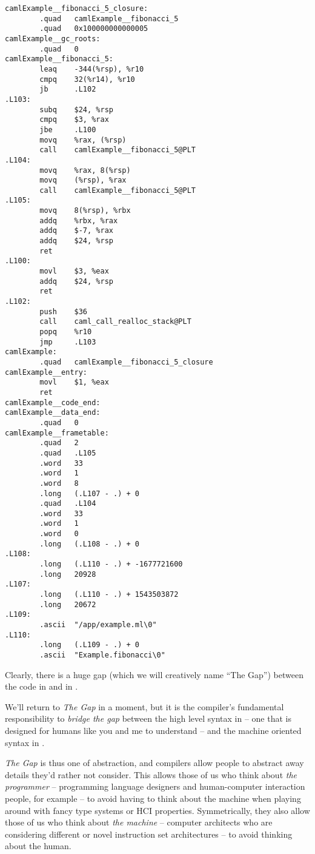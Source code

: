 \begin{code}
\label{code:fib-assembly}
\begin{verbatim}
camlExample__fibonacci_5_closure:
        .quad   camlExample__fibonacci_5
        .quad   0x100000000000005
camlExample__gc_roots:
        .quad   0
camlExample__fibonacci_5:
        leaq    -344(%rsp), %r10
        cmpq    32(%r14), %r10
        jb      .L102
.L103:
        subq    $24, %rsp
        cmpq    $3, %rax
        jbe     .L100
        movq    %rax, (%rsp)
        call    camlExample__fibonacci_5@PLT
.L104:
        movq    %rax, 8(%rsp)
        movq    (%rsp), %rax
        call    camlExample__fibonacci_5@PLT
.L105:
        movq    8(%rsp), %rbx
        addq    %rbx, %rax
        addq    $-7, %rax
        addq    $24, %rsp
        ret
.L100:
        movl    $3, %eax
        addq    $24, %rsp
        ret
.L102:
        push    $36
        call    caml_call_realloc_stack@PLT
        popq    %r10
        jmp     .L103
camlExample:
        .quad   camlExample__fibonacci_5_closure
camlExample__entry:
        movl    $1, %eax
        ret
camlExample__code_end:
camlExample__data_end:
        .quad   0
camlExample__frametable:
        .quad   2
        .quad   .L105
        .word   33
        .word   1
        .word   8
        .long   (.L107 - .) + 0
        .quad   .L104
        .word   33
        .word   1
        .word   0
        .long   (.L108 - .) + 0
.L108:
        .long   (.L110 - .) + -1677721600
        .long   20928
.L107:
        .long   (.L110 - .) + 1543503872
        .long   20672
.L109:
        .ascii  "/app/example.ml\0"
.L110:
        .long   (.L109 - .) + 0
        .ascii  "Example.fibonacci\0"
\end{verbatim}
\end{code}

Clearly, there is a huge gap (which we will creatively name ``The Gap'') between the code in  and in .

We'll return to \emph{The Gap} in a moment, but it is the compiler's fundamental responsibility to \emph{bridge the gap} between the high level syntax in  -- one that is designed for humans like you and me to understand -- and the machine oriented syntax in . 

\emph{The Gap} is thus one of abstraction, and compilers allow people to abstract away details they'd rather not consider. This allows those of us who think about \emph{the programmer} -- programming language designers and human-computer interaction people, for example -- to avoid having to think about the machine when playing around with fancy type systems or HCI properties. Symmetrically, they also allow those of us who think about \emph{the machine} -- computer architects who are considering different or novel instruction set architectures -- to avoid thinking about the human. 

